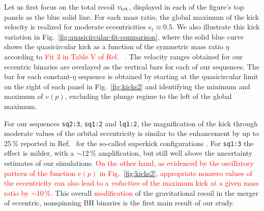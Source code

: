 \documentclass[floats,floatfix,showpacs,amssymb,prd,twocolumn,superscriptaddress,nofootinbib,nolongbibliography,reprint]{revtex4-2}
\newcommand{\mr}[1]{{\textcolor{cyan}{\sf{[MR: #1]}} }}
\newcommand{\us}[1]{{\textcolor{teal}{\sf{[US: #1]}} }}
\newcommand{\new}[1]{{\textcolor{red}{ #1} }}
\begin{document}
Let us first focus on the total recoil $v_{\rm tot}$, displayed in each
of the figure's top panels as the blue solid line.  For each mass
ratio, the global maximum of the kick velocity is realized for
moderate eccentricities
$e_t\approx 0.5$.
We also illustrate this kick variation in
Fig.~\ref{fig:quasicircular-fit-comparison}, where
the solid blue curve shows the
quasicircular kick as a function
of the symmetric mass ratio $\eta$ according to
\new{Fit 3 in Table V of Ref.%
~\cite{Healy:2017mvh}.} The velocity ranges
obtained for our eccentric binaries are
overlayed as the vertical bars for each of our sequences.
The bar for each constant-$\eta$ sequence
is obtained by starting at the quasicircular limit on the 
right of each panel in Fig.~\ref{fig:kicks2} and identifying
the minimum and maximum of $v(p)$, excluding the 
plunge regime to the left of the global maximum.

For our sequences \texttt{sq2:3}, \texttt{sq1:2} and
\texttt{lq1:2}, the 
magnification of the kick through moderate values
of the orbital eccentricity is similar to the
enhancement by up to 25\,\% reported in
Ref.~\cite{Sperhake:2019wwo}
for the so-called superkick configurations
\cite{Gonzalez:2007hi,Campanelli:2007cga}.
For \texttt{sq1:3} the effect is milder, with a
$\sim 12\,\%$ amplification, but still well above
the uncertainty estimates of our simulations.
\new{On the other hand, as evidenced by the oscillatory pattern
of the function $v(p)$ in Fig.~\ref{fig:kicks2}, appropriate
nonzero values of the eccentricity can also
lead to a {\it reduction} of the maximum kick at a given mass ratio
by $\sim 10\,\%$.
}
This overall \new{modification} of the gravitational recoil
in the merger of eccentric, nonspinning BH binaries
is the first main result of our study.
\end{document}
